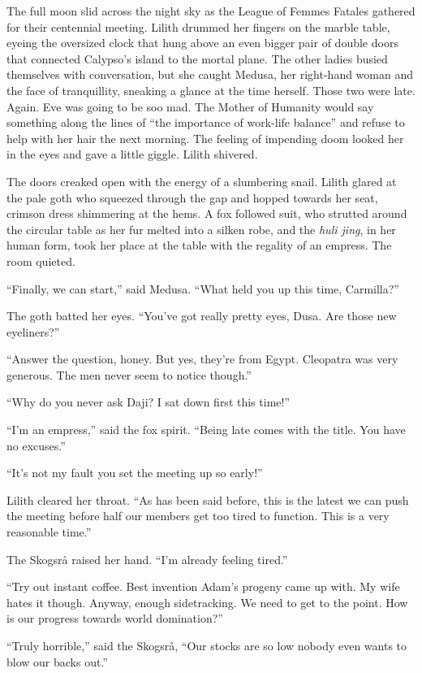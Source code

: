 \noindent The full moon slid across the night sky as the League of Femmes Fatales gathered for their centennial meeting. Lilith drummed her fingers on the marble table, eyeing the oversized clock that hung above an even bigger pair of double doors that connected Calypso’s island to the mortal plane. The other ladies busied themselves with conversation, but she caught Medusa, her right-hand woman and the face of tranquillity, sneaking a glance at the time herself. Those two were late. Again. Eve was going to be soo mad. The Mother of Humanity would say something along the lines of “the importance of work-life balance” and refuse to help with her hair the next morning. The feeling of impending doom looked her in the eyes and gave a little giggle. Lilith shivered.

The doors creaked open with the energy of a slumbering snail. Lilith glared at the pale goth who squeezed through the gap and hopped towards her seat, crimson dress shimmering at the hems. A fox followed suit, who strutted around the circular table as her fur melted into a silken robe, and the \textit{huli jing}, in her human form, took her place at the table with the regality of an empress. The room quieted.

“Finally, we can start,” said Medusa. “What held you up this time, Carmilla?”

The goth batted her eyes. “You’ve got really pretty eyes, Dusa. Are those new eyeliners?”

“Answer the question, honey. But yes, they’re from Egypt. Cleopatra was very generous. The men never seem to notice though.”

“Why do you never ask Daji? I sat down first this time!”

“I’m an empress,” said the fox spirit. “Being late comes with the title. You have no excuses.”

“It’s not my fault you set the meeting up so early!”

Lilith cleared her throat. “As has been said before, this is the latest we can push the meeting before half our members get too tired to function. This is a very reasonable time.”

The Skogsrå raised her hand. “I’m already feeling tired.”

“Try out instant coffee. Best invention Adam’s progeny came up with. My wife hates it though. Anyway, enough sidetracking. We need to get to the point. How is our progress towards world domination?”

“Truly horrible,” said the Skogsrå, “Our stocks are so low nobody even wants to blow our backs out.”

